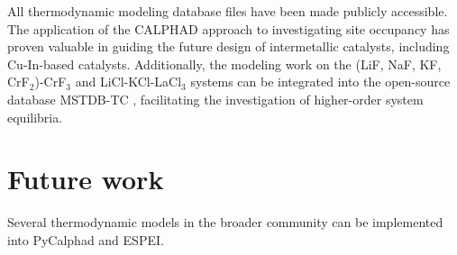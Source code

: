 All thermodynamic modeling database files have been made publicly accessible. The application of the CALPHAD approach to investigating site occupancy has proven valuable in guiding the future design of intermetallic catalysts, including Cu-In-based catalysts. Additionally, the modeling work on the (LiF, NaF, KF, CrF${_2}$)-CrF${_3}$ and LiCl-KCl-LaCl${_3}$ systems can be integrated into the open-source database MSTDB-TC \cite{ard2022development}, facilitating the investigation of higher-order system equilibria.

\section{Future work} \label{conclusion:sec:future}
Several thermodynamic models in the broader community can be implemented into PyCalphad and ESPEI. 


